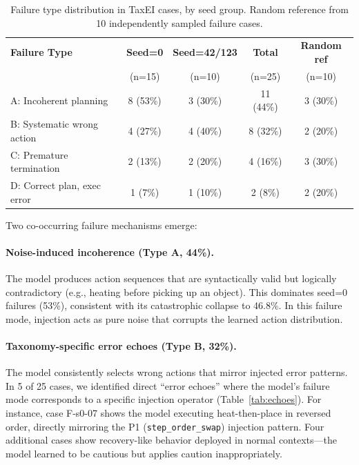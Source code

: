 \documentclass[11pt,a4paper]{article}
\begin{document}
\begin{table}[t]
\centering
\small
\caption{Failure type distribution in TaxEI cases, by seed group. Random reference from 10 independently sampled failure cases.}
\label{tab:failure_types}
\begin{tabular}{lcccc}
\toprule
\textbf{Failure Type} & \textbf{Seed=0} & \textbf{Seed=42/123} & \textbf{Total} & \textbf{Random ref} \\
 & (n=15) & (n=10) & (n=25) & (n=10) \\
\midrule
A: Incoherent planning & 8 (53\%) & 3 (30\%) & 11 (44\%) & 3 (30\%) \\
B: Systematic wrong action & 4 (27\%) & 4 (40\%) & 8 (32\%) & 2 (20\%) \\
C: Premature termination & 2 (13\%) & 2 (20\%) & 4 (16\%) & 3 (30\%) \\
D: Correct plan, exec error & 1 (7\%) & 1 (10\%) & 2 (8\%) & 2 (20\%) \\
\bottomrule
\end{tabular}
\end{table}

Two co-occurring failure mechanisms emerge:

\paragraph{Noise-induced incoherence (Type A, 44\%).} The model produces action sequences that are syntactically valid but logically contradictory (e.g., heating before picking up an object). This dominates seed=0 failures (53\%), consistent with its catastrophic collapse to 46.8\%. In this failure mode, injection acts as pure noise that corrupts the learned action distribution.

\paragraph{Taxonomy-specific error echoes (Type B, 32\%).} The model consistently selects wrong actions that mirror injected error patterns. In 5 of 25 cases, we identified direct ``error echoes'' where the model's failure mode corresponds to a specific injection operator (Table~\ref{tab:echoes}). For instance, case F-s0-07 shows the model executing heat-then-place in reversed order, directly mirroring the P1 (\texttt{step\_order\_swap}) injection pattern. Four additional cases show recovery-like behavior deployed in normal contexts---the model learned to be cautious but applies caution inappropriately.
\end{document}

